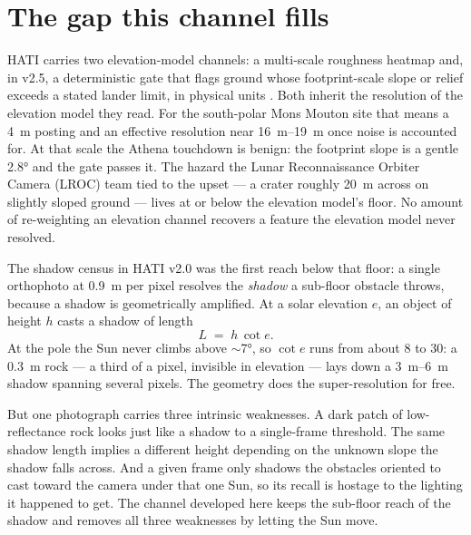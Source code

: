 \documentclass[11pt]{article}
\begin{document}
\section{The gap this channel fills}

HATI carries two elevation-model channels: a multi-scale roughness heatmap and, in v2.5, a
deterministic gate that flags ground whose footprint-scale slope or relief exceeds a stated
lander limit, in physical units \autocite{henriksen2017}. Both inherit the resolution of
the elevation model they read. For the south-polar Mons Mouton site that means a
\SI{4}{\meter} posting and an effective resolution near \SIrange{16}{19}{\meter} once noise
is accounted for. At that scale the Athena touchdown is benign: the footprint slope is a
gentle \ang{2.8} and the gate passes it. The hazard the Lunar Reconnaissance Orbiter Camera
(LROC) team tied to the upset --- a crater roughly \SI{20}{\meter} across on slightly sloped
ground --- lives at or below the elevation model's floor. No amount of re-weighting an
elevation channel recovers a feature the elevation model never resolved.

The shadow census in HATI v2.0 was the first reach below that floor: a single orthophoto at
\SI{0.9}{\meter} per pixel \autocite{robinson2010} resolves the \emph{shadow} a sub-floor
obstacle throws, because a shadow is geometrically amplified. At a solar elevation $e$, an
object of height $h$ casts a shadow of length
\begin{equation}
  L \;=\; h\,\cot e .
  \label{eq:shadowlaw}
\end{equation}
At the pole the Sun never climbs above $\sim$\ang{7}, so $\cot e$ runs from about \num{8} to
\num{30}: a \SI{0.3}{\meter} rock --- a third of a pixel, invisible in elevation --- lays
down a \SIrange{3}{6}{\meter} shadow spanning several pixels. The geometry does the
super-resolution for free.

But one photograph carries three intrinsic weaknesses. A dark patch of low-reflectance
rock looks just like a shadow to a single-frame threshold. The same shadow length implies a
different height depending on the unknown slope the shadow falls across. And a given frame
only shadows the obstacles oriented to cast toward the camera under that one Sun, so its
recall is hostage to the lighting it happened to get. The channel developed here keeps the
sub-floor reach of the shadow and removes all three weaknesses by letting the Sun move.
\end{document}
